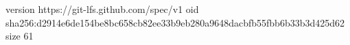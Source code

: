version https://git-lfs.github.com/spec/v1
oid sha256:d2914e6de154be8bc658cb82ee33b9eb280a9648dacbfb55fbb6b33b3d425d62
size 61

